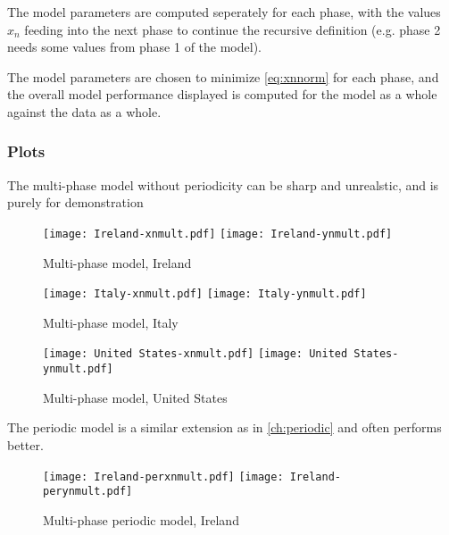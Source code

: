 The model parameters are computed seperately for each phase, with the values $x_n$ feeding into the next phase to continue the recursive definition (e.g. phase 2 needs some values from phase 1 of the model).

The model parameters are chosen to minimize \ref{eq:xnnorm} for each phase, and the overall model performance displayed is computed for the model as a whole against the data as a whole.

\subsubsection{Plots}

The multi-phase model without periodicity can be sharp and unrealstic, and is purely for demonstration

\begin{figure}[H]
  \texttt{[image: Ireland-xnmult.pdf]} \label{fig:ireland-xnmult}
\endminipage\hfill
{}
  \texttt{[image: Ireland-ynmult.pdf]} \label{fig:ireland-ynmult}
\endminipage
\caption{Multi-phase model, Ireland}
\end{figure}

\begin{figure}[H]
  \texttt{[image: Italy-xnmult.pdf]} \label{fig:italy-xnmult}
\endminipage\hfill
{}
  \texttt{[image: Italy-ynmult.pdf]} \label{fig:italy-ynmult}
\endminipage
\caption{Multi-phase model, Italy}
\end{figure}

\begin{figure}[H]
  \texttt{[image: United States-xnmult.pdf]} \label{fig:usa-xnmult}
\endminipage\hfill
{}
  \texttt{[image: United States-ynmult.pdf]} \label{fig:usa-ynmult}
\endminipage
\caption{Multi-phase model, United States}
\end{figure}

The periodic model is a similar extension as in \ref{ch:periodic} and often performs better.

\begin{figure}[H]
  \texttt{[image: Ireland-perxnmult.pdf]} \label{fig:ireland-perxnmult}
\endminipage\hfill
{}
  \texttt{[image: Ireland-perynmult.pdf]} \label{fig:ireland-perynmult}
\endminipage
\caption{Multi-phase periodic model, Ireland}
\end{figure}

